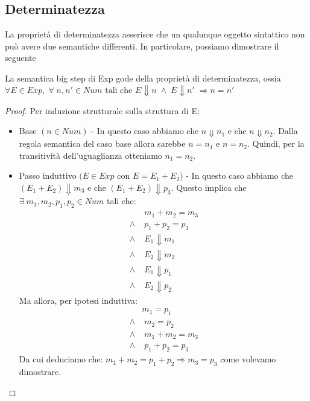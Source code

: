 \subsection{Determinatezza}
La proprietà di determinatezza asserisce che un qualunque oggetto sintattico non può
avere due semantiche differenti. In particolare, possiamo dimostrare il seguente

\begin{teorema}[Determinatezza]
La semantica big step di Exp gode della proprietà di determinatezza, ossia
$\forall E \in Exp, \; \forall \; n, n' \in Num \text{ tali che }
 E\Downarrow n \; \land \; E \Downarrow n' \; \Rightarrow n = n'$
\end{teorema}

\begin{proof}
Per induzione strutturale sulla struttura di E:
\begin{itemize}
	\item Base $(n \in Num)$ - 
		  In questo caso abbiamo che $n \Downarrow n_1$ e che $n \Downarrow n_2$.
		  Dalla regola semantica del caso base allora sarebbe $n=n_1$ e $n=n_2$.
		  Quindi, per la transitività dell'uguaglianza otteniamo $n_1 = n_2$.
	\item Passo induttivo $(E \in Exp$ con $E=E_1 + E_2$) - 
		  In questo caso abbiamo che $(E_1 + E_2) \Downarrow m_3$ e che $(E_1+E_2) \Downarrow p_3$.
		  Questo implica che $ \exists \; m_1,m_2,p_1,p_2 \in Num$ tali che:
		  \begin{align*}
		   & m_1 + m_2 = m_3 \\
		     \land \; & p_1+p_2 = p_3 \\
		     \land \; & E_1 \Downarrow m_1 \\
		     \land \; & E_2 \Downarrow m_2 \\ 
		     \land \; & E_1 \Downarrow p_1 \\ 
		     \land \; & E_2 \Downarrow p_2
		    \end{align*}
		  Ma allora, per ipotesi induttiva:
		  \begin{align*}
		  & m_1 = p_1 \\
		    \land & \; m_2 = p_2 \\
		    \land & \; m_1+m_2=m_3 \\
		    \land & \; p_1 + p_2 = p_3
		  \end{align*}
		  Da cui deduciamo che:
		  $ m_1 + m_2 = p_1 + p_2 \Rightarrow m_3 = p_3$ come volevamo dimostrare.
\end{itemize}
\end{proof}

